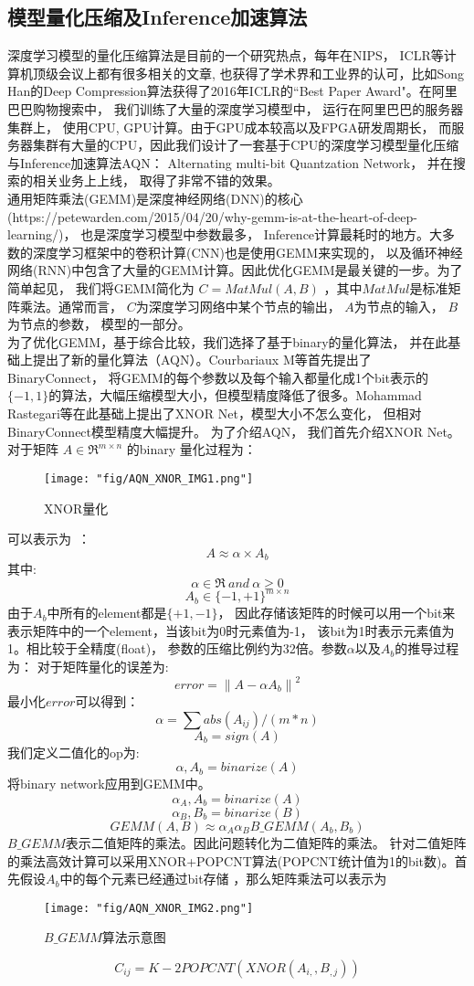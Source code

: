 \subsection{模型量化压缩及Inference加速算法}
深度学习模型的量化压缩算法是目前的一个研究热点，每年在NIPS， ICLR等计算机顶级会议上都有很多相关的文章, 也获得了学术界和工业界的认可，比如Song Han的Deep Compression算法获得了2016年ICLR的“Best Paper Award"。在阿里巴巴购物搜索中， 我们训练了大量的深度学习模型中， 运行在阿里巴巴的服务器集群上， 使用CPU, GPU计算。由于GPU成本较高以及FPGA研发周期长， 而服务器集群有大量的CPU，因此我们设计了一套基于CPU的深度学习模型量化压缩与Inference加速算法AQN： Alternating multi-bit Quantzation Network， 并在搜索的相关业务上上线， 取得了非常不错的效果。 \\
通用矩阵乘法(GEMM)是深度神经网络(DNN)的核心(https://petewarden.com/2015/04/20/why-gemm-is-at-the-heart-of-deep-learning/)，  也是深度学习模型中参数最多， Inference计算最耗时的地方。大多数的深度学习框架中的卷积计算(CNN)也是使用GEMM来实现的， 以及循环神经网络(RNN)中包含了大量的GEMM计算。因此优化GEMM是最关键的一步。为了简单起见， 我们将GEMM简化为  $C = MatMul(A, B)$ ，其中$MatMul$是标准矩阵乘法。通常而言， $C$为深度学习网络中某个节点的输出， $A$为节点的输入， $B$为节点的参数， 模型的一部分。 \\
为了优化GEMM，基于综合比较，我们选择了基于binary的量化算法， 并在此基础上提出了新的量化算法（AQN）。Courbariaux M等首先提出了BinaryConnect， 将GEMM的每个参数以及每个输入都量化成1个bit表示的$\{-1, 1\}$的算法，大幅压缩模型大小，但模型精度降低了很多。Mohammad Rastegari等在此基础上提出了XNOR Net，模型大小不怎么变化， 但相对BinaryConnect模型精度大幅提升。 为了介绍AQN， 我们首先介绍XNOR Net。对于矩阵 $A \in  \Re^{m \times n} $ 的binary 量化过程为：
\begin{figure}[!h]
    \centering
    \texttt{[image: "fig/AQN\_XNOR\_IMG1.png"]}
    \caption{XNOR量化}
    \label{fig:aqn_xnor_img1}
\end{figure}

可以表示为 ：$$A \approx \alpha \times A_b$$
其中:$$\alpha \in \Re \ and \ \alpha \geq 0$$ $$A_b \in \{-1, +1\}^{m \times n}$$
由于$A_b$中所有的element都是$\{+1, -1\}$， 因此存储该矩阵的时候可以用一个bit来表示矩阵中的一个element，当该bit为0时元素值为-1， 该bit为1时表示元素值为1。相比较于全精度(float)， 参数的压缩比例约为32倍。参数$\alpha$以及$A_b$的推导过程为：
对于矩阵量化的误差为:$$ error = \left\lVert A - \alpha A_b \right\rVert ^ 2 $$
最小化$error$可以得到：
$$\alpha = \sum abs(A_{ij}) / (m*n) $$ $$A_b = sign(A)$$
我们定义二值化的op为:$$\alpha, A_b=binarize(A)$$
将binary network应用到GEMM中。
 $$\alpha_A, A_b = binarize(A)$$
 $$\alpha_B, B_b = binarize(B)$$
$$GEMM(A,B) \approx \alpha_A \alpha_B B\_GEMM(A_b, B_b)$$
$B\_GEMM$表示二值矩阵的乘法。因此问题转化为二值矩阵的乘法。 针对二值矩阵的乘法高效计算可以采用XNOR+POPCNT算法(POPCNT统计值为1的bit数)。首先假设$A_b$中的每个元素已经通过bit存储 ，那么矩阵乘法可以表示为
\begin{figure}[!h]
    \centering
    \texttt{[image: "fig/AQN\_XNOR\_IMG2.png"]}
    \caption{$B\_GEMM$算法示意图}
    \label{fig:AQN_XNOR_IMG2}
\end{figure}
$$C_{ij}=K-2POPCNT(XNOR(A_{i,}, B_{,j})) $$


